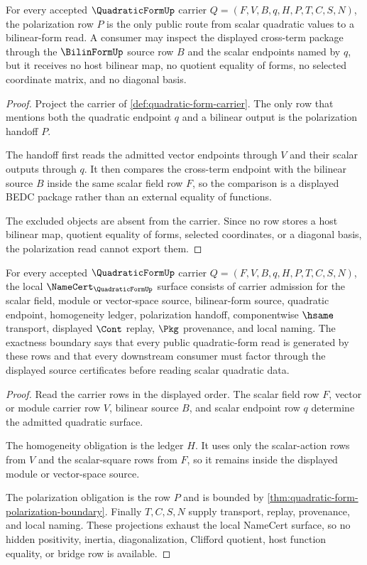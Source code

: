 \begin{theorem}
\label{thm:quadratic-form-polarization-boundary}
For every accepted $\QuadraticFormUp$ carrier $Q=(F,V,B,q,H,P,T,C,S,N)$, the polarization row $P$ is the only public route from scalar quadratic values to a bilinear-form read. A consumer may inspect the displayed cross-term package through the $\BilinFormUp$ source row $B$ and the scalar endpoints named by $q$, but it receives no host bilinear map, no quotient equality of forms, no selected coordinate matrix, and no diagonal basis.
\end{theorem}
\begin{proof}
Project the carrier of \autoref{def:quadratic-form-carrier}. The only row that mentions both the quadratic endpoint $q$ and a bilinear output is the polarization handoff $P$.

The handoff first reads the admitted vector endpoints through $V$ and their scalar outputs through $q$. It then compares the cross-term endpoint with the bilinear source $B$ inside the same scalar field row $F$, so the comparison is a displayed BEDC package rather than an external equality of functions.

The excluded objects are absent from the carrier. Since no row stores a host bilinear map, quotient equality of forms, selected coordinates, or a diagonal basis, the polarization read cannot export them.
\end{proof}

\begin{theorem}
\label{thm:quadratic-form-namecert-obligations}
For every accepted $\QuadraticFormUp$ carrier $Q=(F,V,B,q,H,P,T,C,S,N)$, the local $\NameCert_{\QuadraticFormUp}$ surface consists of carrier admission for the scalar field, module or vector-space source, bilinear-form source, quadratic endpoint, homogeneity ledger, polarization handoff, componentwise $\hsame$ transport, displayed $\Cont$ replay, $\Pkg$ provenance, and local naming. The exactness boundary says that every public quadratic-form read is generated by these rows and that every downstream consumer must factor through the displayed source certificates before reading scalar quadratic data.
\end{theorem}
\begin{proof}
Read the carrier rows in the displayed order. The scalar field row $F$, vector or module carrier row $V$, bilinear source $B$, and scalar endpoint row $q$ determine the admitted quadratic surface.

The homogeneity obligation is the ledger $H$. It uses only the scalar-action rows from $V$ and the scalar-square rows from $F$, so it remains inside the displayed module or vector-space source.

The polarization obligation is the row $P$ and is bounded by \autoref{thm:quadratic-form-polarization-boundary}. Finally $T,C,S,N$ supply transport, replay, provenance, and local naming. These projections exhaust the local NameCert surface, so no hidden positivity, inertia, diagonalization, Clifford quotient, host function equality, or bridge row is available.
\end{proof}


